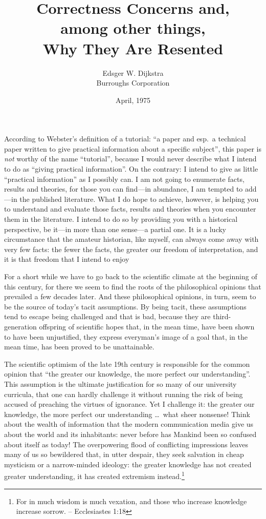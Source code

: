 \documentclass[12pt,letterpaper]{article}
\title{Correctness Concerns and,\\
among other things,\\
Why They Are Resented}
\author{Edsger W. Dijkstra\\
Burroughs Corporation}
\date{April, 1975}
\begin{document}
\maketitle

\noindent According to Webster's definition of a tutorial: ``a paper and esp.~a technical paper written 
to give practical information about a specific subject'', this paper is \emph{not} worthy of the name
``tutorial'', because I would never describe what I intend 
to do as ``giving practical information''. On the 
contrary: I intend to give as little ``practical 
information'' as I possibly can. I am not going to 
enumerate facts, results and theories, for those 
you can find---in abundance, I am tempted to add---in the published literature. What I do hope to 
achieve, however, is helping you to understand and 
evaluate those facts, results and theories when 
you encounter them in the literature. I intend to 
do so by providing you with a historical perspective, be it---in more than one sense---a partial 
one. It is a lucky circumstance that the amateur 
historian, like myself, can always come away with 
very few facts: the fewer the facts, the greater 
our freedom of interpretation, and it is that freedom that I intend to enjoy

For a short while we have to go back to the 
scientific climate at the beginning of this century, for there we seem to find the roots of the 
philosophical opinions that prevailed a few decades later. And these philosophical opinions, in 
turn, seem to be the source of today's tacit assumptions. By being tacit, these assumptions tend to 
escape being challenged and that is bad, because 
they are third-generation offspring of scientific 
hopes that, in the mean time, have been shown to 
have been unjustified, they express everyman's image 
of a goal that, in the mean time, has been proved 
to be unattainable. 

The scientific optimism of the late 19th century is responsible for the common opinion that ``the 
greater our knowledge, the more perfect our understanding''. This assumption is the ultimate justification for so many of our university curricula, that 
one can hardly challenge it without running the risk 
of being accused of preaching the virtues of ignorance. Yet I challenge it: the greater our knowledge, 
the more perfect our understanding \ldots\ what sheer 
nonsense! Think about the wealth of information 
that the modern communication media give us about 
the world and its inhabitants: never before has Mankind been so confused about itself as today! 
The overpowering flood of conflicting impressions 
leaves many of us so bewildered that, in utter despair, they seek salvation in cheap mysticism or 
a narrow-minded ideology: the greater knowledge 
has not created greater understanding, it has created extremism instead.\footnote{For in much wisdom is much vexation, and those who increase knowledge increase sorrow. -- Ecclesiastes 1:18}
\end{document}
